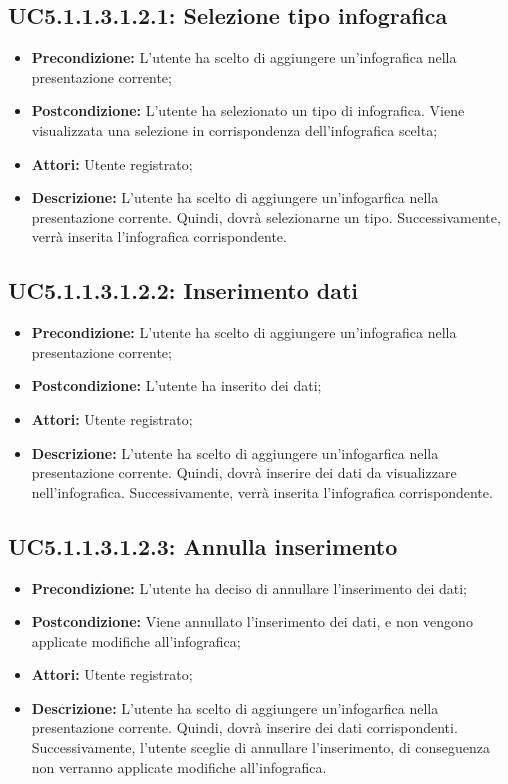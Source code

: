 \subsection{ UC5.1.1.3.1.2.1: Selezione tipo infografica}

\begin{itemize}
	\item \textbf{Precondizione:} L'utente ha scelto di aggiungere un'infografica nella presentazione corrente;
	\item \textbf{Postcondizione:} L'utente ha selezionato un tipo di infografica. Viene visualizzata una selezione in corrispondenza dell'infografica scelta;
	\item \textbf{Attori:} Utente registrato;
	\item \textbf{Descrizione:} L'utente ha scelto di aggiungere un'infogarfica nella presentazione corrente. Quindi, dovrà selezionarne un tipo. Successivamente, verrà inserita l'infografica corrispondente.
\end{itemize}
\subsection{ UC5.1.1.3.1.2.2: Inserimento dati}

\begin{itemize}
	\item \textbf{Precondizione:} L'utente ha scelto di aggiungere un'infografica nella presentazione corrente;
	\item \textbf{Postcondizione:} L'utente ha inserito dei dati;
	\item \textbf{Attori:} Utente registrato;
	\item \textbf{Descrizione:} L'utente ha scelto di aggiungere un'infogarfica nella presentazione corrente. Quindi, dovrà inserire dei dati da visualizzare nell'infografica. Successivamente, verrà inserita l'infografica corrispondente.
\end{itemize}
\subsection{ UC5.1.1.3.1.2.3: Annulla inserimento}

\begin{itemize}
	\item \textbf{Precondizione:} L'utente ha deciso di annullare l'inserimento dei dati;
	\item \textbf{Postcondizione:} Viene annullato l'inserimento dei dati, e non vengono applicate modifiche all'infografica;
	\item \textbf{Attori:} Utente registrato;
	\item \textbf{Descrizione:} L'utente ha scelto di aggiungere un'infogarfica nella presentazione corrente. Quindi, dovrà inserire dei dati corrispondenti. Successivamente, l'utente sceglie di annullare l'inserimento, di conseguenza non verranno applicate modifiche all'infografica.
\end{itemize}
